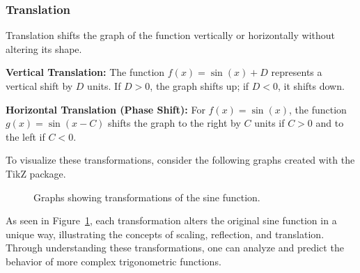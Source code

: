 \documentclass[a4paper,12pt]{book}
\begin{document}
\subsubsection{Translation}
Translation shifts the graph of the function vertically or horizontally without altering its shape.

\textbf{Vertical Translation:} The function \( f(x) = \sin(x) + D \) represents a vertical shift by \( D \) units. If \( D > 0 \), the graph shifts up; if \( D < 0 \), it shifts down.

\textbf{Horizontal Translation (Phase Shift):} For \( f(x) = \sin(x) \), the function \( g(x) = \sin(x - C) \) shifts the graph to the right by \( C \) units if \( C > 0 \) and to the left if \( C < 0 \).

To visualize these transformations, consider the following graphs created with the TikZ package.


\begin{figure}[htbp]
\centering
{}
\caption{Graphs showing transformations of the sine function.}
\label{fig:sine_transformations}
\end{figure}

As seen in Figure~\ref{fig:sine_transformations}, each transformation alters the original sine function in a unique way, illustrating the concepts of scaling, reflection, and translation. Through understanding these transformations, one can analyze and predict the behavior of more complex trigonometric functions.
\end{document}
